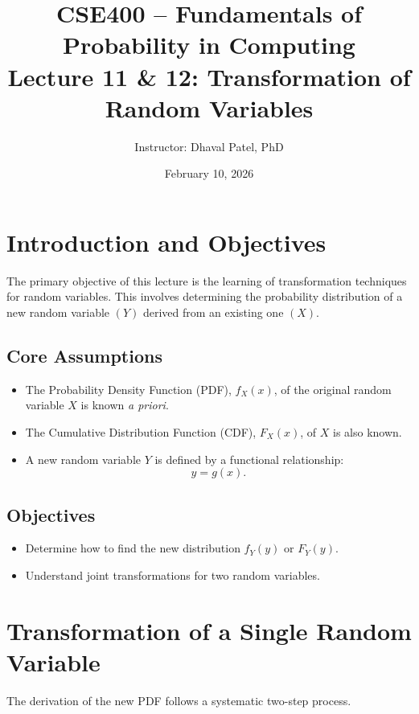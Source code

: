 \documentclass[11pt]{article}
\title{
CSE400 -- Fundamentals of Probability in Computing\\
Lecture 11 \& 12: Transformation of Random Variables
}
\author{Instructor: Dhaval Patel, PhD}
\date{February 10, 2026}
\begin{document}
\maketitle


\section{Introduction and Objectives}

The primary objective of this lecture is the learning of transformation techniques for random variables.  
This involves determining the probability distribution of a new random variable $(Y)$ derived from an existing one $(X)$.

\subsection{Core Assumptions}

\begin{itemize}
    \item The Probability Density Function (PDF), $f_X(x)$, of the original random variable $X$ is known \textit{a priori}.
    \item The Cumulative Distribution Function (CDF), $F_X(x)$, of $X$ is also known.
    \item A new random variable $Y$ is defined by a functional relationship:
    \[
    y = g(x).
    \]
\end{itemize}

\subsection{Objectives}

\begin{itemize}
    \item Determine how to find the new distribution $f_Y(y)$ or $F_Y(y)$.
    \item Understand joint transformations for two random variables.
\end{itemize}


\section{Transformation of a Single Random Variable}

The derivation of the new PDF follows a systematic two-step process.
\end{document}
